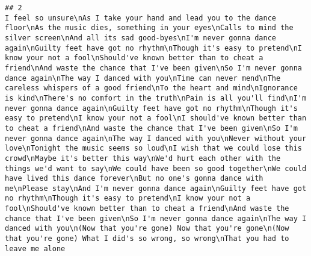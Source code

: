 \documentclass[]{article}
\begin{document}
\begin{verbatim}
## 2                                                                                                                                                                                                                                                                I feel so unsure\nAs I take your hand and lead you to the dance floor\nAs the music dies, something in your eyes\nCalls to mind the silver screen\nAnd all its sad good-byes\nI'm never gonna dance again\nGuilty feet have got no rhythm\nThough it's easy to pretend\nI know your not a fool\nShould've known better than to cheat a friend\nAnd waste the chance that I've been given\nSo I'm never gonna dance again\nThe way I danced with you\nTime can never mend\nThe careless whispers of a good friend\nTo the heart and mind\nIgnorance is kind\nThere's no comfort in the truth\nPain is all you'll find\nI'm never gonna dance again\nGuilty feet have got no rhythm\nThough it's easy to pretend\nI know your not a fool\nI should've known better than to cheat a friend\nAnd waste the chance that I've been given\nSo I'm never gonna dance again\nThe way I danced with you\nNever without your love\nTonight the music seems so loud\nI wish that we could lose this crowd\nMaybe it's better this way\nWe'd hurt each other with the things we'd want to say\nWe could have been so good together\nWe could have lived this dance forever\nBut no one's gonna dance with me\nPlease stay\nAnd I'm never gonna dance again\nGuilty feet have got no rhythm\nThough it's easy to pretend\nI know your not a fool\nShould've known better than to cheat a friend\nAnd waste the chance that I've been given\nSo I'm never gonna dance again\nThe way I danced with you\n(Now that you're gone) Now that you're gone\n(Now that you're gone) What I did's so wrong, so wrong\nThat you had to leave me alone

\end{verbatim}
\end{document}
